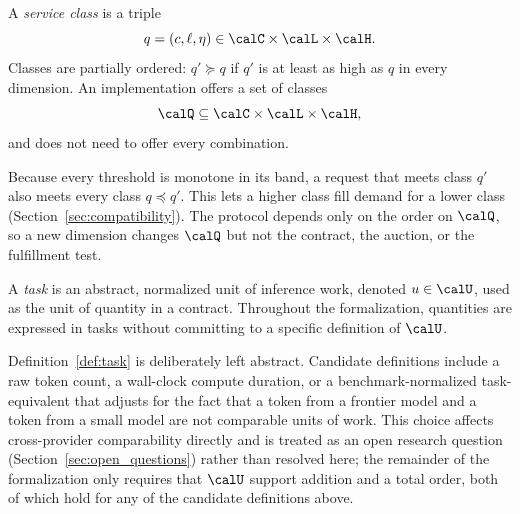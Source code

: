 \begin{definition}
\label{def:service_class}
A \emph{service class} is a triple
$$
  q = (c, \ell, \eta) \in \calC \times \calL \times \calH.
$$
Classes are partially ordered: $q' \succeq q$ if $q'$ is at least as high as
$q$ in every dimension. An implementation offers a set of classes
$$
  \calQ \subseteq \calC \times \calL \times \calH,
$$
and does not need to offer every combination.
\end{definition}

Because every threshold is monotone in its band, a request that meets class
$q'$ also meets every class $q \preceq q'$. This lets a higher class fill
demand for a lower class (Section~\ref{sec:compatibility}). The protocol
depends only on the order on $\calQ$, so a new dimension changes $\calQ$ but
not the contract, the auction, or the fulfillment test.

\begin{definition}
\label{def:task}
A \emph{task} is an abstract, normalized unit of inference work, denoted
$u \in \calU$, used as the unit of quantity in a contract. Throughout the
formalization, quantities are expressed in tasks without committing to a
specific definition of $\calU$.
\end{definition}

Definition~\ref{def:task} is deliberately left abstract. Candidate
definitions include a raw token count, a wall-clock compute duration, or a
benchmark-normalized task-equivalent that adjusts for the fact that a
token from a frontier model and a token from a small model are not
comparable units of work. This choice affects cross-provider
comparability directly and is treated as an open research question
(Section~\ref{sec:open_questions}) rather than resolved here; the
remainder of the formalization only requires that $\calU$ support addition
and a total order, both of which hold for any of the candidate
definitions above.


